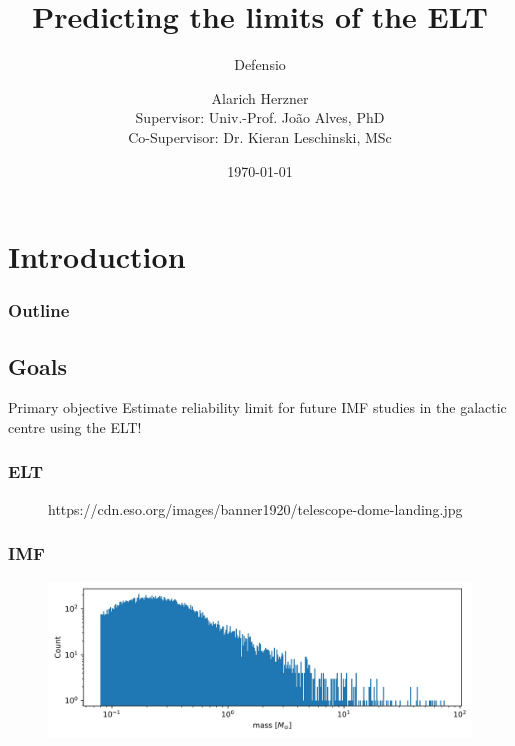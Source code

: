 \documentclass{beamer}
\title{Predicting the limits of the ELT}
\subtitle{Defensio}
\author[Alarich Herzner]{Alarich Herzner\\[1ex]  {\small Supervisor: Univ.-Prof. Jo\~ao Alves, PhD \\ Co-Supervisor: Dr. Kieran Leschinski, MSc}}
\institute{University of Vienna, Faculty of Physics}
\date{\today}
\begin{document}
\begin{frame}
\titlepage
\end{frame}

\section{Introduction}

\begin{frame}
\frametitle{Outline}
\tableofcontents[hideallsubsections] 
\end{frame}


\subsection{Goals}

\begin{frame}
\begin{block}{Primary objective}
Estimate reliability limit for future IMF studies in the galactic centre using the ELT!
\end{block}
\end{frame}

\begin{frame}
\frametitle{ELT}
  \begin{figure}
                  {https://cdn.eso.org/images/banner1920/telescope-dome-landing.jpg}
  \end{figure}
\end{frame}

\begin{frame}
\frametitle{IMF}
  \begin{figure}
  \includegraphics[width=\linewidth]{Images/IMF1.jpg}
  \end{figure}
\end{frame}
\end{document}

